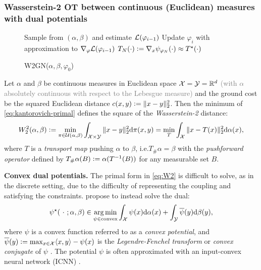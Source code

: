 \documentclass{article}
\newcommand{\ie}{i.e.\xspace}
\newcommand{\defeq}{\vcentcolon=}
\begin{document}
\subsubsection{Wasserstein-2 OT between continuous (Euclidean) measures with dual potentials}
\label{sec:prelim:continuous}
\begin{figure}
  \vspace{-10mm}
  \begin{minipage}{0.48\textwidth}
    \begin{algorithm}[H]
      \caption{\footnotesize W2GN($\alpha, \beta, \varphi_0$)}
      \begin{algorithmic}
        \footnotesize
        \State Sample from $(\alpha,\beta)$ and estimate ${\mathcal{L}}(\varphi_{i-1})$
        \State Update $\varphi_i$ with approximation to $\nabla_\varphi {\mathcal{L}}(\varphi_{i-1})$
        \EndFor
        \State \Return $T_N(\cdot)\defeq\nabla_x \psi_{\varphi_N}(\cdot) \approx T^\star(\cdot)$
      \end{algorithmic}
      \label{alg:w2gn}
    \end{algorithm}
  \end{minipage}
  \vspace{-6mm}
\end{figure}

Let $\alpha$ and $\beta$ be continuous measures in Euclidean
space ${\mathcal{X}}={\mathcal{Y}}=\mathbb{R}^d$ \textcolor{gray}{(with $\alpha$ absolutely continuous
with respect to the Lebesgue measure)} and the ground cost be
the squared Euclidean distance
$c(x,y)\defeq\|x-y\|_2^2$.
Then the minimum of \cref{eq:kantorovich-primal} defines
the square of the \emph{Wasserstein-2} distance:
\begin{equation}
  W_2^2(\alpha,\beta) \defeq \min_{\pi\in\gU(\alpha, \beta)}
    \int_{\gX\times \gY} \|x-y\|_2^2{\rm d}\pi(x,y)
    =
    \min_{T}\int_\gX \|x-T(x)\|_2^2{\rm d}\alpha(x),
  \label{eq:W2}
\end{equation}
where $T$ is a \emph{transport map} pushing
$\alpha$ to $\beta$, \ie $T_{\#}\alpha=\beta$
with the \emph{pushforward operator}
defined by $T_{\#}\alpha(B) \defeq \alpha(T^{-1}(B))$
for any measurable set $B$.

\textbf{Convex dual potentials.}
The primal form in \cref{eq:W2} is difficult to solve, as in the
discrete setting, due to the difficulty of representing the coupling
and satisfying the constraints.
\citet{makkuva2020optimal,taghvaei2019wasserstein,korotin2019wasserstein,korotin2021continuous,korotin2022neural}
propose to instead solve the dual:
\begin{equation}
  \psi^\star(\ \cdot\ ; \alpha, \beta)\in \operatorname*{arg\,min}_{\psi\in{\rm convex}}\int_{\mathcal{X}} \psi(x){\rm d}\alpha(x) + \int_{\mathcal{Y}} \overline\psi(y){\rm d}\beta(y),
  \label{eq:W2-dual}
\end{equation}
where $\psi$ is a convex function referred to as a \emph{convex potential},
and $\overline\psi(y)\defeq \max_{x\in\gX} \langle x, y\rangle - \psi(x)$
is the \emph{Legendre-Fenchel transform} or \emph{convex conjugate}
of $\psi$ \citep{fenchel1949conjugate,rockafellar2015convex}.
The potential $\psi$ is often approximated with an
input-convex neural network (ICNN) \citep{amos2017input}.
\end{document}

